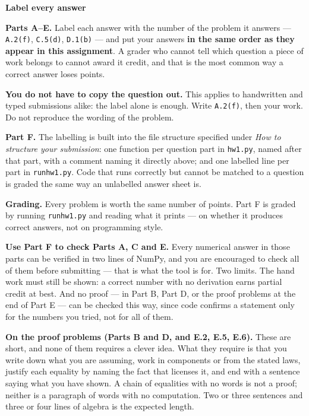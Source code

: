 \documentclass[11pt]{article}
\theoremstyle{definition}
\newenvironment{callout}[1]
  {\par\medskip\needspace{5\baselineskip}%
   \begin{lrbox}{\qcbox}%
   \begin{minipage}{\dimexpr\textwidth-2\fboxsep-4pt}%
   \setlength{\parskip}{0.4em}%
   \textbf{\sffamily\color{RoyalBlue}#1}\par}
  {\end{minipage}\end{lrbox}%
   \begin{center}\colorbox{softbg}{\usebox{\qcbox}}\end{center}\medskip}
\begin{document}
\begin{callout}{Label every answer}
\textbf{Parts A--E.} Label each answer with the number of the problem it answers
--- \texttt{A.2(f)}, \texttt{C.5(d)}, \texttt{D.1(b)} --- and put your answers
\textbf{in the same order as they appear in this assignment}. A grader who
cannot tell which question a piece of work belongs to cannot award it credit,
and that is the most common way a correct answer loses points.

\textbf{You do not have to copy the question out.} This applies to handwritten
and typed submissions alike: the label alone is enough. Write \texttt{A.2(f)},
then your work. Do not reproduce the wording of the problem.

\textbf{Part F.} The labelling is built into the file structure specified under
\emph{How to structure your submission}: one function per question part in
\texttt{hw1.py}, named after that part, with a comment naming it directly above;
and one labelled line per part in \texttt{runhw1.py}. Code that runs correctly
but cannot be matched to a question is graded the same way an unlabelled answer
sheet is.
\end{callout}

\noindent\textbf{Grading.} Every problem is worth the same number of points.
Part F is graded by running \texttt{runhw1.py} and reading what it prints --- on
whether it produces correct answers, not on programming style.

\medskip
\noindent\textbf{Use Part F to check Parts A, C and E.} Every numerical answer in
those parts can be verified in two lines of NumPy, and you are encouraged to
check all of them before submitting --- that is what the tool is for. Two limits.
The hand work must still be shown: a correct number with no derivation earns
partial credit at best. And no proof --- in Part B, Part D, or the proof problems
at the end of Part E --- can be checked this way, since code confirms a statement
only for the numbers you tried, not for all of them.

\medskip
\noindent\textbf{On the proof problems (Parts B and D, and E.2, E.5, E.6).}
These are short, and none of them requires a clever idea. What they require is that you write down
what you are assuming, work in components or from the stated laws, justify each
equality by naming the fact that licenses it, and end with a sentence saying
what you have shown. A chain of equalities with no words is not a proof; neither
is a paragraph of words with no computation. Two or three sentences and three or
four lines of algebra is the expected length.
\end{document}
